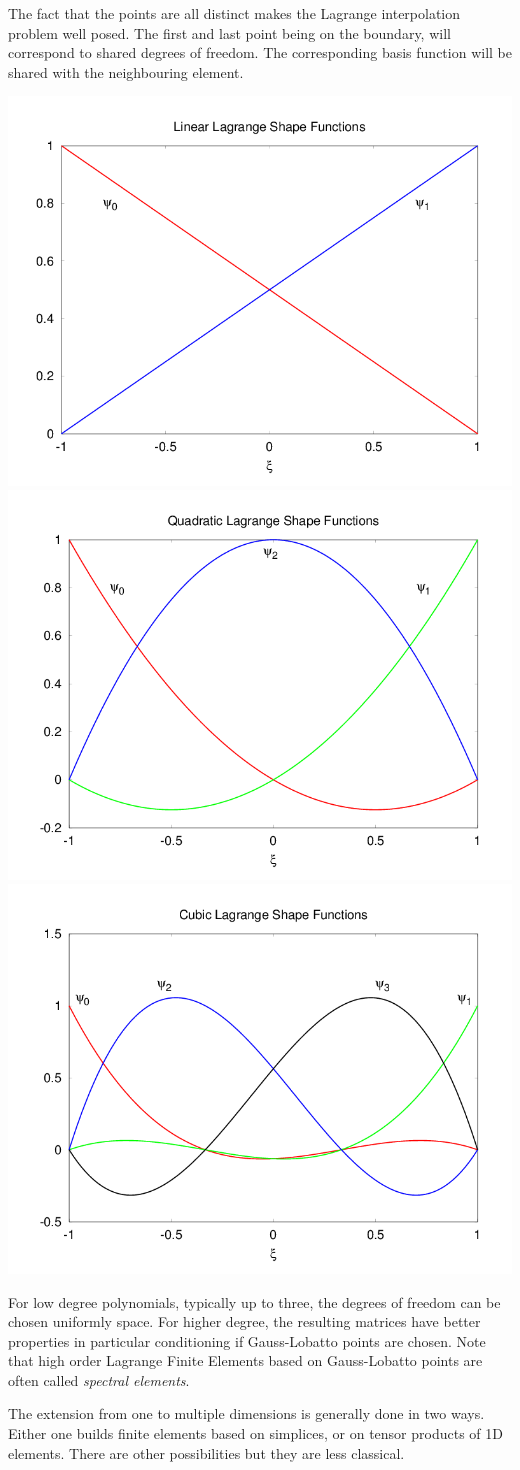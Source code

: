 The fact that the  points  are all distinct makes the Lagrange interpolation problem well posed. The first and last point being on the boundary, will correspond to shared degrees of freedom. The corresponding basis function will be shared with the neighbouring element.

\includegraphics[width=.3\textwidth]{figures/part_4/linear_lagrange}
\includegraphics[width=.3\textwidth]{figures/part_4/quadratic_lagrange}
\includegraphics[width=.3\textwidth]{figures/part_4/cubic_lagrange}
 
For low degree polynomials, typically up to three, the degrees of freedom can be chosen uniformly space. For higher degree, the resulting matrices have better properties in particular conditioning if Gauss-Lobatto points are chosen. Note that high order Lagrange Finite Elements based on Gauss-Lobatto points are often called \emph{spectral elements}.

The extension from one to multiple dimensions is generally done in two ways. Either one builds finite elements based on simplices, or on tensor products of 1D elements. There are other possibilities but they are less classical. 

